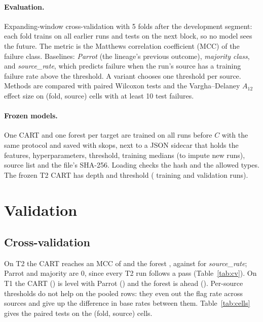 \documentclass[11pt,a4paper]{article}
\newcommand{\tab}[1]{\resizebox{\ifdim\width>\linewidth\linewidth\else\width\fi}{!}{}}
\begin{document}
\paragraph{Evaluation.} Expanding-window cross-validation with 5 folds after the
development segment: each fold trains on all earlier runs and tests on the next
block, so no model sees the future. The metric is the Matthews correlation
coefficient (MCC) of the failure class. Baselines: \emph{Parrot} (the lineage's
previous outcome), \emph{majority class}, and \emph{source\_rate}, which predicts
failure when the run's source has a training failure rate above the threshold. A
variant chooses one threshold per source. Methods are compared with paired
Wilcoxon tests and the Vargha--Delaney $A_{12}$ effect size on (fold, source)
cells with at least 10 test failures.

\paragraph{Frozen models.} One CART and one forest per target are trained on all
runs before $C$ with the same protocol and saved with skops, next to a JSON
sidecar that holds the features, hyperparameters, threshold, training medians (to
impute new runs), source list and the file's SHA-256. Loading checks the hash and
the allowed types. The frozen T2 CART has depth \DepthTwo{} and threshold \ThrTwo{}
(\NTrainTwo{} training and \NValTwo{} validation runs).

\section{Validation}

\subsection{Cross-validation}

\begin{table}[H]
\centering\small
\tab{cv}
\caption{Test MCC on the pooled rows, mean $\pm$ std over the 5 folds, and mean
recall of the failure class.}
\label{tab:cv}
\end{table}

On T2 the CART reaches an MCC of \CVCartTwo{} and the forest \CVForestTwo{},
against \CVSourceRateTwo{} for \emph{source\_rate}; Parrot and majority are 0,
since every T2 run follows a pass (Table~\ref{tab:cv}). On T1 the CART
(\CVCartOne{}) is level with Parrot (\CVParrotOne{}) and the forest is ahead
(\CVForestOne{}). Per-source thresholds do not help on the pooled rows: they even
out the flag rate across sources and give up the difference in base rates between
them. Table~\ref{tab:cells} gives the paired tests on the (fold, source) cells.
\end{document}
